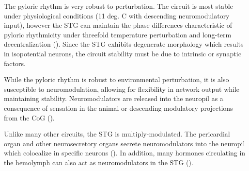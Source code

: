 \documentclass[14pt]{article}
\begin{document}
	The pyloric rhythm is very robust to perturbation. The circuit is most stable under physiological conditions (11 deg. C with descending neuromodulatory input), however the STG can maintain the phase differences characteristic of pyloric rhythmicity under threefold temperature perturbation and long-term decentralization (\cite{HamoodConsequencesacutelongterm2015,GoldmanGlobalStructureRobustness2001,HaddadCircuitrobustnesstemperature2017}). Since the STG exhibits degenerate morphology which results in isopotential neurons, the circuit stability must be due to intrinsic or synaptic factors.
	
	While the pyloric rhythm is robust to environmental perturbation, it is also susceptible to neuromodulation, allowing for  flexibility in network output while maintaining stability. Neuromodulators are released into the neuropil as a consequence of sensation in the animal or descending modulatory projections from the CoG (\cite{MarderNeuromodulationNeuronalCircuits2012,JohnsonAminemodulationglutamate1997,Nusbaumsmallsystemsapproachmotor2002,MarderCentralpatterngenerators2001a,Nusbaumrolescotransmissionneural2001}).
	
	Unlike many other circuits, the STG is multiply-modulated. The pericardial organ and other neurosecretory organs secrete neuromodulators into the neuropil which colocalize in specific neurons (\cite{Nusbaumrolescotransmissionneural2001,BlitzDifferentProctolinNeurons1999}). In addition, many hormones circulating in the hemolymph can also act as neuromodulators in the STG (\cite{Nusbaumrolescotransmissionneural2001,Harris-WarrickDynamicBiologicalNetworks1992}).
	
\end{document}
